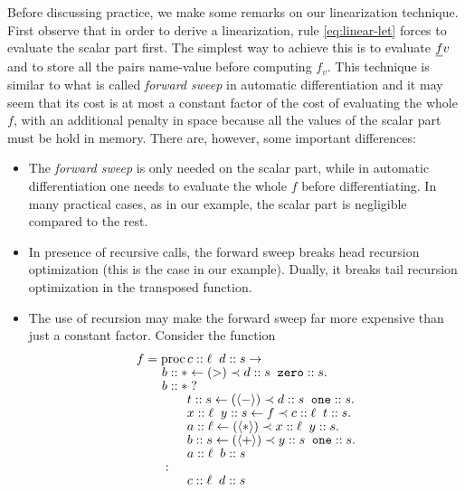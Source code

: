 Before discussing practice, we make some remarks on our linearization
technique. First observe that in order to derive a linearization, rule
\eqref{eq:linear-let} forces to evaluate the scalar part first. The
simplest way to achieve this is to evaluate $\underline{f} v$ and to store all
the pairs name-value before computing $f_v$. This technique is similar
to what is called \emph{forward sweep} in automatic differentiation
\cite{GVM91,Gri92} and it may seem that its cost is at most a constant
factor of the cost of evaluating the whole $f$, with an additional
penalty in space because all the values of the scalar part must be
hold in memory. There are, however, some important differences:
\begin{itemize}
\item The \emph{forward sweep} is only needed on the scalar part,
  while in automatic differentiation one needs to evaluate the whole
  $f$ before differentiating. In many practical cases, as in our
  example, the scalar part is negligible compared to the rest.
\item In presence of recursive calls, the forward sweep breaks head
  recursion optimization (this is the case in our example). Dually, it
  breaks tail recursion optimization in the transposed function.
\item The use of recursion may make the forward sweep far more
  expensive than just a constant factor. Consider the function
  \begin{equation}
    \begin{aligned}
      &f = \operatorname{proc} c::\ell \;\; d::s \rightarrow\\[-1ex]
      &\qquad b::* \leftarrow (>) \prec d::s \;\; \text{\tt zero}::s.\\[-1ex]
      &\qquad b::*\;?\\[-1ex]
      &\qquad\qquad t::s \leftarrow (\langle-\rangle) \prec d::s \;\; \text{\tt one}::s.\\[-1ex]
      &\qquad\qquad x::\ell \;\; y::s \leftarrow f \prec c::\ell \;\; t::s.\\[-1ex]
      &\qquad\qquad a::\ell \leftarrow (\langle*\rangle) \prec x::\ell \;\; y::s.\\[-1ex]
      &\qquad\qquad b::s \leftarrow (\langle+\rangle) \prec y::s\;\;\text{\tt one}::s.\\[-1ex]
      &\qquad\qquad a::\ell\;\;b::s\\[-1ex]
      &\qquad :\\[-1ex]
      &\qquad\qquad c::\ell\;\;d::s
    \end{aligned}
  \end{equation}

\end{itemize}
